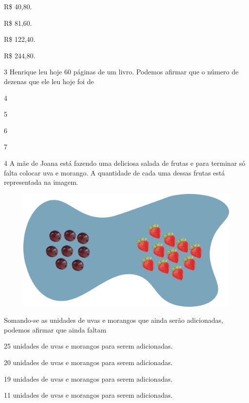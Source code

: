 \begin{escolha}
\item
  R\$ 40,80.
\item
  R\$ 81,60.
\item
  R\$ 122,40.
\item
  R\$ 244,80.
\end{escolha}


\num{3} Henrique leu hoje 60 páginas de um livro. Podemos afirmar que o número de dezenas que ele leu hoje foi de

\begin{multicols}{2}
\begin{escolha}
\item
  4
\item
  5
\item
  6
\item
  7
\end{escolha}
\end{multicols}

\pagebreak
\num{4} A mãe de Joana está fazendo uma deliciosa salada de frutas e para terminar só falta colocar uva e morango. A quantidade de cada uma dessas frutas está representada na imagem.

\begin{figure}[htpb!]
\centering
\includegraphics[width=.8\textwidth]{./media/image114.png}
\end{figure}

Somando-se as unidades de uvas e morangos que ainda serão adicionadas, podemos afirmar que ainda faltam

\begin{escolha}
\item
  25 unidades de uvas e morangos para serem adicionadas.
\item
  20 unidades de uvas e morangos para serem adicionadas.
\item
  19 unidades de uvas e morangos para serem adicionadas.
\item
  11 unidades de uvas e morangos para serem adicionadas.
\end{escolha}


